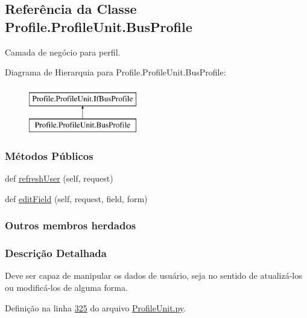 \hypertarget{classProfile_1_1ProfileUnit_1_1BusProfile}{}\subsection{Referência da Classe Profile.\+Profile\+Unit.\+Bus\+Profile}
\label{classProfile_1_1ProfileUnit_1_1BusProfile}


Camada de negócio para perfil.  


Diagrama de Hierarquia para Profile.\+Profile\+Unit.\+Bus\+Profile\+:\begin{figure}[H]
\begin{center}
\leavevmode
\includegraphics[height=2.000000cm]{df/da4/classProfile_1_1ProfileUnit_1_1BusProfile}
\end{center}
\end{figure}
\subsubsection*{Métodos Públicos}
\begin{DoxyCompactItemize}
\item 
def \hyperlink{classProfile_1_1ProfileUnit_1_1BusProfile_ace81426164b30cfa2871e6093052934d}{refresh\+User} (self, request)
\item 
def \hyperlink{classProfile_1_1ProfileUnit_1_1BusProfile_a61886054c405cb4d8ccca925dcfbf399}{edit\+Field} (self, request, field, form)
\end{DoxyCompactItemize}
\subsubsection*{Outros membros herdados}


\subsubsection{Descrição Detalhada}
Deve ser capaz de manipular os dados de usuário, seja no sentido de atualizá-\/los ou modificá-\/los de alguma forma. 

Definição na linha \hyperlink{ProfileUnit_8py_source_l00325}{325} do arquivo \hyperlink{ProfileUnit_8py_source}{Profile\+Unit.\+py}.



